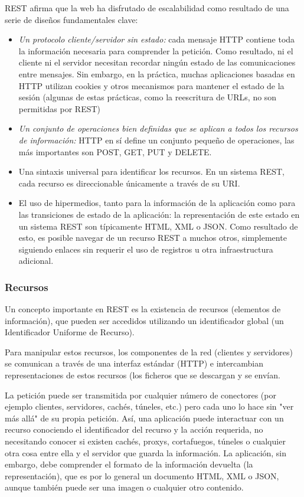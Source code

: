 REST afirma que la web ha disfrutado de escalabilidad como resultado de una serie de diseños fundamentales clave:

\begin{itemize}
    \item \emph{Un protocolo cliente/servidor sin estado:} cada mensaje HTTP contiene toda la información necesaria para comprender la petición. Como resultado, ni el cliente ni el servidor necesitan recordar ningún estado de las comunicaciones entre mensajes. Sin embargo, en la práctica, muchas aplicaciones basadas en HTTP utilizan cookies y otros mecanismos para mantener el estado de la sesión (algunas de estas prácticas, como la reescritura de URLs, no son permitidas por REST)
    
    \item \emph{Un conjunto de operaciones bien definidas que se aplican a todos los recursos de información:} HTTP en sí define un conjunto pequeño de operaciones, las más importantes son POST, GET, PUT y DELETE.
    
    \item Una sintaxis universal para identificar los recursos. En un sistema REST, cada recurso es direccionable únicamente a través de su \gls{URI}.
    \item El uso de hipermedios, tanto para la información de la aplicación como para las transiciones de estado de la aplicación: la representación de este estado en un sistema REST son típicamente \gls{HTML}, XML o JSON. Como resultado de esto, es posible navegar de un recurso REST a muchos otros, simplemente siguiendo enlaces sin requerir el uso de registros u otra infraestructura adicional.
   
 \end{itemize}
 
 \subsubsection{Recursos}
 Un concepto importante en REST es la existencia de recursos (elementos de información), que pueden ser accedidos utilizando un identificador global (un Identificador Uniforme de Recurso).
 
 Para manipular estos recursos, los componentes de la red (clientes y servidores) se comunican a través de una interfaz estándar (HTTP) e intercambian representaciones de estos recursos (los ficheros que se descargan y se envían.
 
La petición puede ser transmitida por cualquier número de conectores (por ejemplo clientes, servidores, cachés, túneles, etc.) pero cada uno lo hace sin "ver más allá" de su propia petición. Así, una aplicación puede interactuar con un recurso conociendo el identificador del recurso y la acción requerida, no necesitando conocer si existen cachés, proxys, cortafuegos, túneles o cualquier otra cosa entre ella y el servidor que guarda la información. La aplicación, sin embargo, debe comprender el formato de la información devuelta (la representación), que es por lo general un documento \gls{HTML}, \gls{XML} o \gls{JSON}, aunque también puede ser una imagen o cualquier otro contenido.


